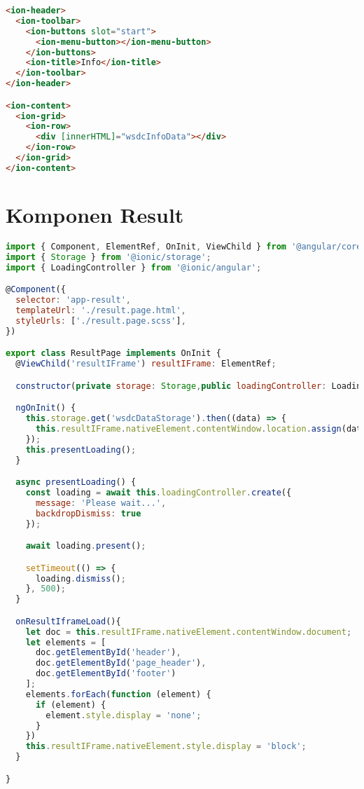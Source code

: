 \begin{lstlisting}[language=html, label={lst:info.page.html}, caption=info.page.html]
<ion-header>
  <ion-toolbar>
    <ion-buttons slot="start">
      <ion-menu-button></ion-menu-button>
    </ion-buttons>
    <ion-title>Info</ion-title>
  </ion-toolbar>
</ion-header>

<ion-content>
  <ion-grid>
    <ion-row>
      <div [innerHTML]="wsdcInfoData"></div>
    </ion-row>
  </ion-grid>
</ion-content>

\end{lstlisting}

\section{Komponen Result} 
\label{sec:lampiranKomponenResult}

\begin{lstlisting}[language=JavaScript, label={lst:result.page.ts}, caption=result.page.ts]
import { Component, ElementRef, OnInit, ViewChild } from '@angular/core';
import { Storage } from '@ionic/storage';
import { LoadingController } from '@ionic/angular';

@Component({
  selector: 'app-result',
  templateUrl: './result.page.html',
  styleUrls: ['./result.page.scss'],
})

export class ResultPage implements OnInit {
  @ViewChild('resultIFrame') resultIFrame: ElementRef;

  constructor(private storage: Storage,public loadingController: LoadingController) { }

  ngOnInit() {
    this.storage.get('wsdcDataStorage').then((data) => {
      this.resultIFrame.nativeElement.contentWindow.location.assign(data.results);
    });
    this.presentLoading();
  }

  async presentLoading() {
    const loading = await this.loadingController.create({
      message: 'Please wait...',
      backdropDismiss: true
    });

    await loading.present();

    setTimeout(() => {
      loading.dismiss();
    }, 500);
  }

  onResultIframeLoad(){
    let doc = this.resultIFrame.nativeElement.contentWindow.document;
    let elements = [
      doc.getElementById('header'),
      doc.getElementById('page_header'),
      doc.getElementById('footer')
    ];
    elements.forEach(function (element) {
      if (element) {
        element.style.display = 'none';
      }
    })
    this.resultIFrame.nativeElement.style.display = 'block';
  }

}

\end{lstlisting} 

